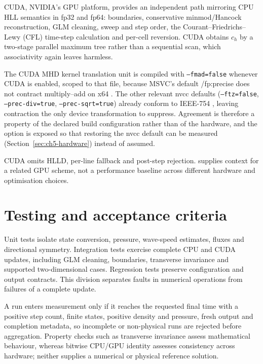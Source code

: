 CUDA, NVIDIA's GPU platform, provides an independent path mirroring CPU HLL
semantics in fp32 and fp64: boundaries, conservative minmod/Hancock
reconstruction, GLM cleaning, sweep and step order, the
Courant--Friedrichs--Lewy (CFL) time-step calculation and per-cell reversion.
CUDA obtains $c_h$ by a two-stage parallel maximum tree rather than a
sequential scan, which associativity again leaves harmless.

The CUDA MHD kernel translation unit is compiled with \texttt{--fmad=false}
whenever CUDA is enabled, scoped to that file, because MSVC's default
/fp:precise does not contract multiply--add on x64
\citep{microsoftMsvcFp2021}. The other relevant nvcc defaults
(\texttt{--ftz=false}, \texttt{--prec-div=true}, \texttt{--prec-sqrt=true})
already conform to IEEE-754 \citep{whiteheadFitFlorea2011gpuFp}, leaving
contraction the only device
transformation to suppress. Agreement is therefore a property of the declared
build configuration rather than of the hardware, and the option is exposed so
that restoring the nvcc default can be measured
(Section~\ref{sec:ch5-hardware}) instead of assumed.

CUDA omits HLLD, per-line fallback and post-step rejection.
\citet{bardDorelli2014gpu} supplies context for a related GPU scheme, not a
performance baseline across different hardware and optimisation choices.

\section{Testing and acceptance criteria}
\label{sec:ch2-gates}

Unit tests isolate state conversion, pressure, wave-speed estimates, fluxes
and directional symmetry. Integration tests exercise complete CPU and CUDA
updates, including GLM cleaning, boundaries, transverse invariance and
supported two-dimensional cases. Regression tests preserve configuration and
output contracts. This division separates faults in numerical operations from
failures of a complete update.

A run enters measurement only if it reaches the requested final time with a
positive step count, finite states, positive density and pressure, fresh output
and completion metadata, so incomplete or non-physical runs are rejected before
aggregation. Property checks such as transverse invariance assess mathematical
behaviour, whereas bitwise CPU/GPU identity assesses consistency across
hardware; neither supplies a numerical or physical reference solution.
